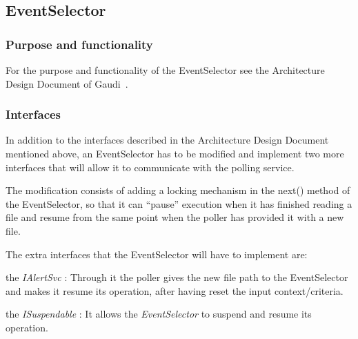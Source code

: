 \subsection{\textbf{EventSelector}}

\subsubsection{\textbf{Purpose and functionality}}
For the purpose and functionality of the EventSelector see the Architecture Design Document of Gaudi~\cite{mato1998gaudi}. 

\subsubsection{\textbf{Interfaces}}
In addition to the interfaces described in the Architecture Design Document mentioned above, an EventSelector has to be modified and implement two more interfaces that will allow it to communicate with the polling service.\par
\bigskip\noindent
The modification consists of adding a locking mechanism in the next() method of the EventSelector, so that it can “pause” execution when it has finished reading a file and resume from the same point when the poller has provided it with a new file.\par
\bigskip\noindent
The extra interfaces that the EventSelector will have to implement are:\par
\bigskip\noindent
the \textit{IAlertSvc} : Through it the poller gives the new file path to the EventSelector and makes it resume its operation, after having reset the input context/criteria.\par
\bigskip\noindent
the \textit{ISuspendable} : It allows the \textit{EventSelector} to suspend and resume its operation.
